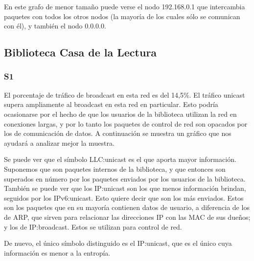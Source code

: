 En este grafo de menor tamaño puede verse el nodo 192.168.0.1 que
intercambia paquetes con todos los otros nodos (la mayoría de los
cuales sólo se comunican con él), y también el nodo 0.0.0.0.

\subsection{Biblioteca Casa de la Lectura}
\subsubsection{S1}

El porcentaje de tráfico de broadcast en esta red es del 14,5\%. El tráfico unicast supera ampliamente
al broadcast en esta red en particular. Esto podría ocasionarse por el hecho de que los
usuarios de la biblioteca utilizan la red en conexiones largas, y por lo tanto los paquetes
de control de red son opacados por los de comunicación de datos. A continuación se muestra un
gráfico que nos ayudará a analizar mejor la muestra.



Se puede ver que el símbolo LLC:unicast es el que aporta mayor información.
Suponemos que son paquetes internos de la biblioteca, y que entonces son
superados en número por los paquetes enviados por los usuarios de la biblioteca.
También se puede ver que los IP:unicast son los que menos información brindan,
seguidos por los IPv6:unicast. Esto quiere decir que son los más enviados.
Estos son los paquetes que en su mayoría contienen datos de usuario,
a diferencia de los de ARP, que sirven para relacionar las direcciones IP con
las MAC de sus dueños; y los de IP:broadcast. Estos se utilizan para control de red.



De nuevo, el único símbolo distinguido es el IP:unicast, que es el único cuya
información es menor a la entropía.

